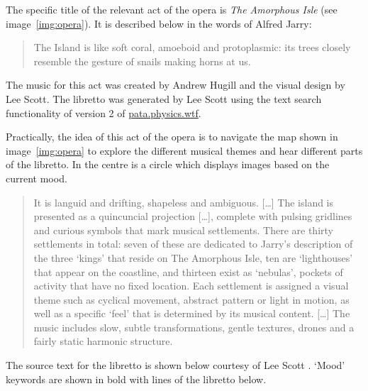 The specific title of the relevant act of the opera is \emph{The Amorphous Isle} \autocite{Hugill2014a} (see image~\ref{img:opera}). It is described below in the words of Alfred Jarry:

\begin{quotation}
  The Island is like soft coral, amoeboid and protoplasmic: its trees closely resemble the gesture of snails making horns at us. 
\end{quotation}

The music for this act was created by Andrew Hugill and the visual design by Lee Scott. The libretto was generated by Lee Scott using the text search functionality of version 2 of \url{pata.physics.wtf}.

Practically, the idea of this act of the opera is to navigate the map shown in image~\ref{img:opera} to explore the different musical themes and hear different parts of the libretto. In the centre is a circle which displays images based on the current mood.

\begin{quotation}
  It is languid and drifting, shapeless and ambiguous. [\ldots] The island is presented as a quincuncial projection [\ldots], complete with pulsing gridlines and curious symbols that mark musical settlements. There are thirty settlements in total: seven of these are dedicated to Jarry's description of the three `kings' that reside on The Amorphous Isle, ten are `lighthouses' that appear on the coastline, and thirteen exist as `nebulas', pockets of activity that have no fixed location. Each settlement is assigned a visual theme such as cyclical movement, abstract pattern or light in motion, as well as a specific `feel' that is determined by its musical content. [\ldots] The music includes slow, subtle transformations, gentle textures, drones and a fairly static harmonic structure. 
\end{quotation}

The source text for the libretto is shown below courtesy of Lee Scott \autocite*{Scott2014}. `Mood' keywords are shown in bold with lines of the libretto below.

